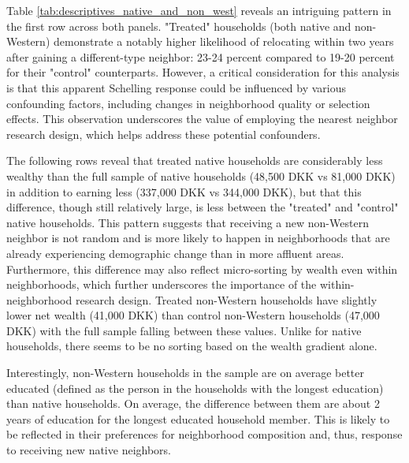 \documentclass[main.tex]{subfiles}
\begin{document}
Table \ref{tab:descriptives_native_and_non_west} reveals an intriguing pattern in the first row across both panels. "Treated" households (both native and non-Western) demonstrate a notably higher likelihood of relocating within two years after gaining a different-type neighbor: 23-24 percent compared to 19-20 percent for their "control" counterparts. However, a critical consideration for this analysis is that this apparent Schelling response could be influenced by various confounding factors, including changes in neighborhood quality or selection effects. This observation underscores the value of employing the nearest neighbor research design, which helps address these potential confounders.

The following rows reveal that treated native households are considerably less wealthy than the full sample of native households (48,500 DKK vs 81,000 DKK) in addition to earning less (337,000 DKK vs 344,000 DKK), but that this difference, though still relatively large, is less between the "treated" and "control" native households. This pattern suggests that receiving a new non-Western neighbor is not random and is more likely to happen in neighborhoods that are already experiencing demographic change than in more affluent areas. Furthermore, this difference may also reflect micro-sorting by wealth even within neighborhoods, which further underscores the importance of the within-neighborhood research design. Treated non-Western households have slightly lower net wealth (41,000 DKK) than control non-Western households (47,000 DKK) with the full sample falling between these values. Unlike for native households, there seems to be no sorting based on the wealth gradient alone.   

Interestingly, non-Western households in the sample are on average better educated (defined as the person in the households with the longest education) than native households. On average, the difference between them are about 2 years of education for the longest educated household member. This is likely to be reflected in their preferences for neighborhood composition and, thus, response to receiving new native neighbors.
\end{document}
